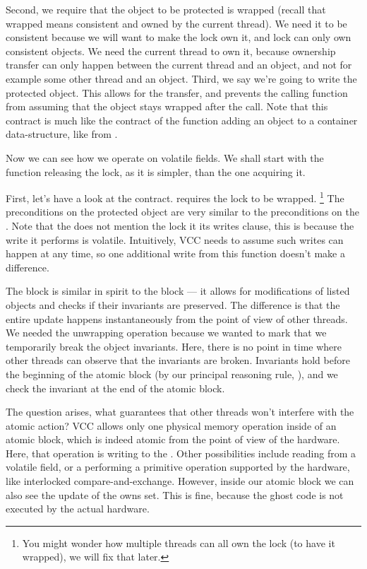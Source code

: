 Second, we require that the object to be protected is wrapped (recall that wrapped means consistent
and owned by the current thread).
We need it to be consistent because we will want to make the lock own it, and
lock can only own consistent objects.
We need the current thread to own it, because ownership transfer can
only happen between the current thread and an object,
and not for example some other thread and an object.
Third, we say we're going to write the protected object.
This allows for the transfer, and prevents the calling function from assuming
that the object stays wrapped after the call.
Note that this contract is much like the contract of the function
adding an object to a container data-structure, like
 from .

Now we can see how we operate on volatile fields.
We shall start with the function releasing the lock, as it is simpler,
than the one acquiring it.


\noindent
First, let's have a look at the contract.
 requires the lock to be wrapped.%
\footnote{ You might wonder how multiple threads can all own the lock (to have it
wrapped), we will fix that later. }
The preconditions on the protected object are very similar to the
preconditions on the .
Note that the  does not mention the lock it its writes clause,
this is because the write it performs is volatile.
Intuitively, VCC needs to assume such writes can happen at any time, so one additional
write from this function doesn't make a difference.

The  block is similar in spirit to the  block ---
it allows for modifications of listed objects and checks if their invariants
are preserved.
The difference is that the entire update happens instantaneously from the point
of view of other threads.
We needed the unwrapping operation because we wanted to mark that we temporarily
break the object invariants.
Here, there is no point in time where other threads can observe that the invariants
are broken.
Invariants hold before the beginning of the atomic block (by our principal reasoning
rule, ), and we check the invariant at the end of the atomic block.

The question arises, what guarantees that other threads won't interfere with the atomic
action?
VCC allows only one physical memory operation inside of an atomic block,
which is indeed atomic from the point of view of the hardware.
Here, that operation is writing to the .
Other possibilities include reading from a volatile field, or a performing
a primitive operation supported by the hardware, like interlocked
compare-and-exchange.
However, inside our atomic block we can also see the update of the owns set.
This is fine, because the ghost code is not executed by the actual hardware.

